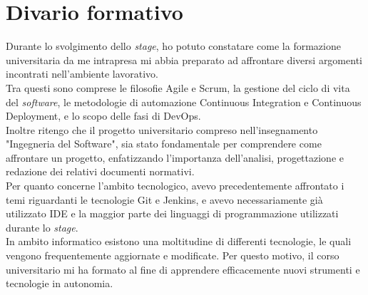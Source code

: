 \section{Divario formativo}
Durante lo svolgimento dello \emph{stage}, ho potuto constatare come la formazione universitaria da me intrapresa mi abbia preparato ad affrontare diversi argomenti incontrati nell'ambiente lavorativo.\\
Tra questi sono comprese le filosofie Agile e Scrum, la gestione del ciclo di vita del \emph{software}, le metodologie di automazione \gls{Continuous Integration} e \gls{Continuous Deployment}, e lo scopo delle fasi di \gls{DevOps}.\\
Inoltre ritengo che il progetto universitario compreso nell'insegnamento "Ingegneria del Software", sia stato fondamentale per comprendere come affrontare un progetto, enfatizzando l'importanza dell'analisi, progettazione e redazione dei relativi documenti normativi.\\
Per quanto concerne l'ambito tecnologico, avevo precedentemente affrontato i temi riguardanti le tecnologie Git e Jenkins, e avevo necessariamente già utilizzato IDE e la maggior parte dei linguaggi di programmazione utilizzati durante lo \emph{stage}.\\ 
In ambito informatico esistono una moltitudine di differenti tecnologie, le quali vengono frequentemente aggiornate e modificate. 
Per questo motivo, il corso universitario mi ha formato al fine di apprendere efficacemente nuovi strumenti e tecnologie in autonomia. 

